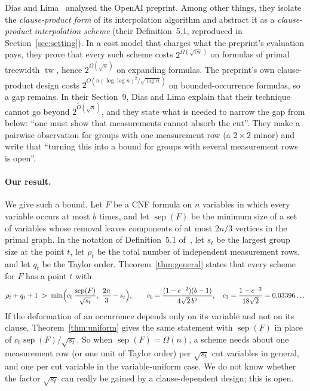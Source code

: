 \documentclass[11pt,a4paper]{article}
\theoremstyle{definition}
\theoremstyle{remark}
\newcommand{\sep}{\operatorname{sep}}
\newcommand{\tw}{\operatorname{tw}}
\begin{document}
Dias and Lima~\cite{DL} analysed the OpenAI preprint. Among other things, they isolate the
\emph{clause-product form} of its interpolation algorithm and abstract it as a
\emph{clause-product interpolation scheme} (their Definition~5.1, reproduced in
Section~\ref{sec:setting}). In a cost model that charges what the preprint's evaluation pays,
they prove that every such scheme costs $2^{\Omega(\sqrt{\tw})}$ on formulas of primal
treewidth $\tw$, hence $2^{\Omega(\sqrt n)}$ on expanding formulas. The preprint's own
clause-product design costs $2^{O(n(\log\log n)^2/\sqrt{\log n})}$ on bounded-occurrence
formulas, so a gap remains. In their Section~9, Dias and Lima explain that their technique
cannot go beyond $2^{\tilde O(\sqrt n)}$, and they state what is needed to narrow the gap from
below: ``one must show that measurements cannot absorb the cut''. They make a pairwise
observation for groups with one measurement row (a $2\times2$ minor) and write that ``turning
this into a bound for groups with several measurement rows is open''.

\paragraph{Our result.} We give such a bound. Let $F$ be a CNF formula on $n$ variables in
which every variable occurs at most $b$ times, and let $\sep(F)$ be the minimum size of a set
of variables whose removal leaves components of at most $2n/3$ vertices in the primal graph.
In the notation of Definition~5.1 of~\cite{DL}, let $s_t$ be the largest group size at the
point $t$, let $\rho_t$ be the total number of independent measurement rows, and let $q_t$ be
the Taylor order. Theorem~\ref{thm:general} states that every scheme for $F$ has a point $t$
with
\begin{equation}\label{eq:intro}
\rho_t+q_t+1\;>\;\min\Bigl(c_b\,\frac{\sep(F)}{\sqrt{s_t}},\ \frac{2n}{3}-s_t\Bigr),
\qquad c_b=\frac{(1-e^{-2})(b-1)}{4\sqrt2\,b^2},\quad c_3=\frac{1-e^{-2}}{18\sqrt2}=0.03396\ldots
\end{equation}
If the deformation of an occurrence depends only on its variable and not on its clause,
Theorem~\ref{thm:uniform} gives the same statement with $\sep(F)$ in place of
$c_b\sep(F)/\sqrt{s_t}$. So when $\sep(F)=\Omega(n)$, a scheme needs about one measurement row
(or one unit of Taylor order) per $\sqrt{s_t}$ cut variables in general, and one per cut
variable in the variable-uniform case. We do not know whether the factor $\sqrt{s_t}$ can
really be gained by a clause-dependent design; this is open.
\end{document}
